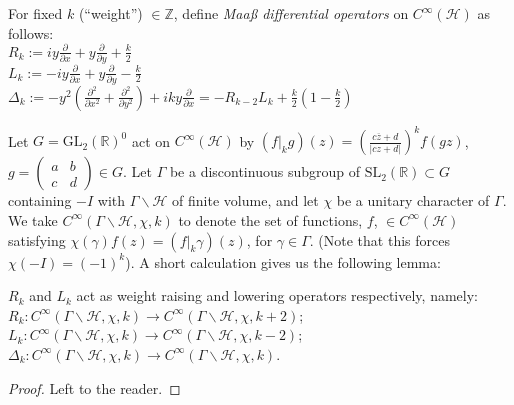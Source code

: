 \begin{definition}
\label{definition-Maass-differential-operators}

For fixed $k$ (``weight'') $\in \mathbb{Z}$, define \textit{Maa{\ss} differential operators} on $C^{\infty}(\mathcal{H})$ as follows: \\
$R_{k} := iy \frac{\partial}{\partial x} + y \frac{\partial}{\partial y} + \frac{k}{2}$ \\
$L_{k} := -iy \frac{\partial}{\partial x} + y \frac{\partial}{\partial y} - \frac{k}{2}$ \\
$\Delta_{k} := -y^{2} (\frac{\partial^{2}}{\partial x^{2}} + \frac{\partial^{2}}{\partial y^{2}}) + iky \frac{\partial}{\partial x}  = -R_{k-2}L_{k} + \frac{k}{2}(1 - \frac{k}{2})$
\end{definition}

Let $G = \text{GL}_2(\mathbb{R})^0$ act on $C^{\infty}(\mathcal{H})$ by
$(f|_{k} g) (z) = \left(\frac{c\overline{z} + d}{|cz + d|}\right)^{k} f(gz)$, $g = \begin{pmatrix}  a & b \\ c& d \end{pmatrix} \in G$. Let $\Gamma$ be a discontinuous subgroup of $\text{SL}_2(\mathbb{R}) \subset G$ containing $-I$ with $\Gamma \backslash \mathcal{H}$ of finite volume, and let $\chi$ be a unitary character of $\Gamma$. We take $C^{\infty}(\Gamma \backslash \mathcal{H}, \chi, k)$ to denote the set of functions, $f$, $\in C^{\infty}(\mathcal{H})$ satisfying $\chi(\gamma)f(z) = (f|_k \gamma)(z)$, for $\gamma \in \Gamma$. (Note that this forces $\chi(-I) = (-1)^{k}$). A short calculation gives us the following lemma:

\begin{lemma}
\label{lemma-level-raising-lowering}
$R_k$ and $L_k$ act as weight raising and lowering operators respectively, namely:
	$R_k: C^{\infty}(\Gamma \backslash \mathcal{H}, \chi, k) \to C^{\infty}(\Gamma \backslash \mathcal{H}, \chi, k+2)$;
	$L_k: C^{\infty}(\Gamma \backslash \mathcal{H}, \chi, k) \to C^{\infty}(\Gamma \backslash \mathcal{H}, \chi, k-2)$;
	$\Delta_k: C^{\infty}(\Gamma \backslash \mathcal{H}, \chi, k) \to C^{\infty}(\Gamma \backslash \mathcal{H}, \chi, k)$.
\end{lemma}

\begin{proof}
 Left to the reader.
\end{proof}



